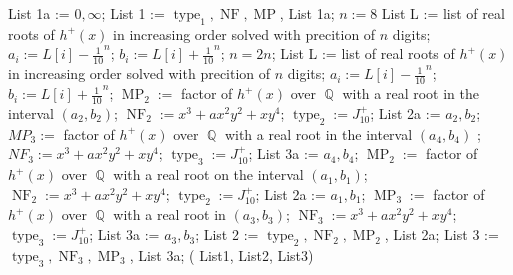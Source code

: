 \documentclass[noend]{amsproc}
\theoremstyle{definition}
\DeclareMathOperator{\size}{size}
\DeclareMathOperator{\MP}{MP}
\DeclareMathOperator{\type}{type}
\DeclareMathOperator{\val}{value}
\DeclareMathOperator{\NF}{NF}
\DeclareMathOperator{\Q}{\mathbb{Q}}
\begin{document}
\begin{algorithm}[ht]
\begin{algorithmic}[1]
\State List 1a := $0, \infty$;
\State List 1 := $\type_1, \NF, \MP$, List 1a;
\EndIf
\State $n:=8$
\State List L := list of real roots of $h^+(x)$ in increasing order solved with precition of $n$ digits;
\For{$i=1,\ldots,\size(L)$}
\State $a_i := L[i]-\frac{1}{10}^n$;
\State $b_i := L[i]+\frac{1}{10}^n$;
\EndFor
{}
\State $n=2n$;
\State List L := list of real roots of $h^+(x)$ in increasing order solved with precition of $n$ digits;
\For{$i=1,\ldots,\size(L)$}
\State $a_i := L[i]-\frac{1}{10}^n$;
\State $b_i := L[i]+\frac{1}{10}^n$;
\EndFor
\EndWhile
{}
\State $\MP_2:= $ factor of $h^+(x)$ over $\Q$ with a real root in the interval $(a_2,b_2)$;
\State $\NF_2:= x^3+ax^2y^2+xy^4$;
\State $\type_2 := J_{10}^+$;
\State List 2a := $a_2,b_2$;
\State $MP_3:= $ factor of $h^+(x)$ over $\Q$ with a real root in the interval $(a_4,b_4)$ ;
\State $NF_3:= x^3+ax^2y^2+xy^4$;
\State $\type_3 := J_{10}^+$;
\State List 3a := $a_4,b_4$;
\Else
\State $\MP_2:= $ factor of $h^+(x)$ over $\Q$ with a real root on the interval $(a_1,b_1)$;
\State $\NF_2:= x^3+ax^2y^2+xy^4$;
\State $\type_2 := J_{10}^+$;
\State List 2a := $a_1,b_1$;
\State $\MP_3:= $ factor of $h^+(x)$ over $\Q$ with a real root in $(a_3,b_3)$;
\State $\NF_3:= x^3+ax^2y^2+xy^4$;
\State $\type_3 := J_{10}^+$;
\State List 3a := $a_3,b_3$;
\EndIf
\State List 2 := $\type_2, \NF_2, \MP_2$, List 2a;
\State List 3 := $\type_3, \NF_3, \MP_3$, List 3a;
\Return( List1, List2, List3)
\EndIf
\end{algorithmic}
\end{algorithm}
\end{document}
